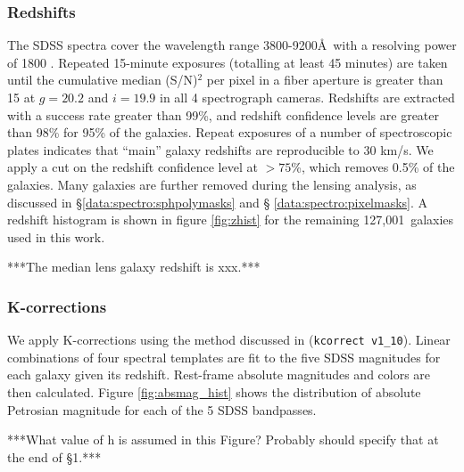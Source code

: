 \documentclass{emulateapj}
\newcommand{\numspec}{127,001}
\begin{document}
\subsubsection{Redshifts} \label{data:spectro:z}

The SDSS spectra cover the wavelength range 3800-9200\AA\ with a resolving
power of 1800 \citep{Stough02}. Repeated 15-minute exposures (totalling 
at least 45 minutes) are taken until 
the cumulative median (S/N)$^2$ per pixel 
in a fiber aperture is greater than 15 at $g=20.2$ and $i=19.9$ in all 4 
spectrograph cameras. Redshifts
are extracted with a success rate greater than 99\%, and redshift confidence
levels are greater than 98\% for 95\% of the galaxies. Repeat exposures 
of a number of spectroscopic plates indicates that ``main'' galaxy 
redshifts are reproducible to 30 km/s.  We apply a cut on the redshift confidence 
level at $>75$\%, which removes 0.5\% of the galaxies.
Many galaxies are further removed during the lensing
analysis, as discussed in \S \ref{data:spectro:sphpolymasks} and \S
\ref{data:spectro:pixelmasks}.
A redshift histogram is shown in figure \ref{fig:zhist} for the remaining \numspec\
galaxies used in this work.

***The median lens galaxy redshift is xxx.***

\begin{figure}[htbp]
 
\end{figure}

\subsubsection{K-corrections} \label{data:spectro:kcorr}

We apply K-corrections using the method discussed in \citet{Blanton02}
(\texttt{kcorrect v1\_10}).  Linear combinations of four spectral templates are
fit to the five SDSS magnitudes for each galaxy given its redshift.  Rest-frame
absolute magnitudes and colors are then calculated.  Figure
\ref{fig:absmag_hist} shows the distribution of absolute Petrosian magnitude 
for each of the 5 SDSS bandpasses.

***What value of h is assumed in this Figure? Probably should specify that 
at the end of \S 1.***
\end{document}
